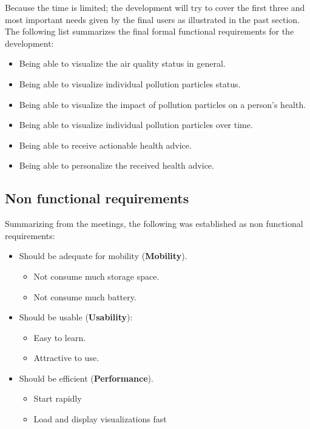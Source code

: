 Because the time is limited; the development will try to cover the first three and most important needs given by the final users as illustrated in the past section. The following list summarizes the final formal functional requirements for the development:

\begin{itemize}
	\item Being able to visualize the air quality status in general.
	\item Being able to visualize individual pollution particles status.
	\item Being able to visualize the impact of pollution particles on a person's health.
	\item Being able to visualize individual pollution particles over time.
    \item Being able to receive actionable health advice.
    \item Being able to personalize the received health advice.
\end{itemize}

\subsection{Non functional requirements}

Summarizing from the meetings, the following was established as non functional requirements:

\begin{itemize}
	\item Should be adequate for mobility (\textbf{Mobility}).
	\begin{itemize}
		\item Not consume much storage space.
		\item Not consume much battery.
	\end{itemize}
    \item Should be usable (\textbf{Usability}):
    \begin{itemize}
		\item Easy to learn.
        \item Attractive to use.
	\end{itemize}
    \item Should be efficient (\textbf{Performance}).
    \begin{itemize}
		\item Start rapidly
        \item Load and display visualizations fast
	\end{itemize}
    
\end{itemize}


